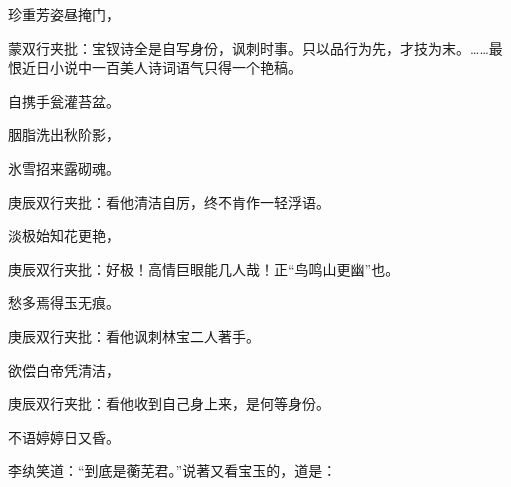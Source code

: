 \begin{poem}
    \begin{pl}珍重芳姿昼掩门，\end{pl}
    \begin{note}蒙双行夹批：宝钗诗全是自写身份，讽刺时事。只以品行为先，才技为末。……最恨近日小说中一百美人诗词语气只得一个艳稿。\end{note}

    \begin{pl}自携手瓮灌苔盆。\end{pl}

    \begin{pl}胭脂洗出秋阶影，\end{pl}

    \begin{pl}氷雪招来露砌魂。\end{pl}
    \begin{note}庚辰双行夹批：看他清洁自厉，终不肯作一轻浮语。\end{note}
    \begin{pl}淡极始知花更艳，\end{pl}
    \begin{note}庚辰双行夹批：好极！高情巨眼能几人哉！正“鸟鸣山更幽”也。\end{note}

    \begin{pl}愁多焉得玉无痕。\end{pl}
    \begin{note}庚辰双行夹批：看他讽刺林宝二人著手。\end{note}

    \begin{pl}欲偿白帝凭清洁，\end{pl}
    \begin{note}庚辰双行夹批：看他收到自己身上来，是何等身份。\end{note}

    \begin{pl}不语婷婷日又昏。    \end{pl}
\end{poem}


\begin{parag}
    李纨笑道：“到底是蘅芜君。”说著又看宝玉的，道是：
\end{parag}


